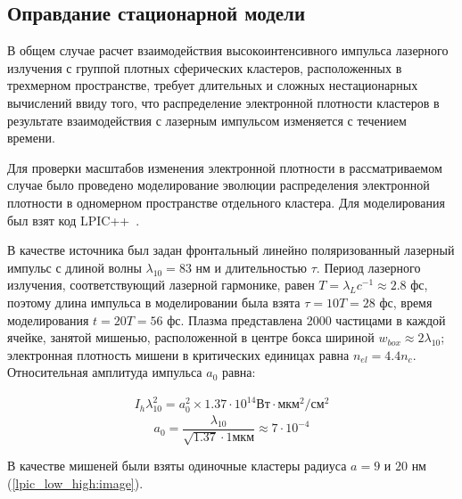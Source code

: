 \subsection{Оправдание стационарной модели}

В общем случае расчет взаимодействия высокоинтенсивного импульса лазерного излучения с группой плотных сферических кластеров, расположенных в трехмерном пространстве, требует длительных и сложных нестационарных вычислений ввиду того, что распределение электронной плотности кластеров в результате взаимодействия с лазерным импульсом изменяется с течением времени.

Для проверки масштабов изменения электронной плотности в рассматриваемом случае было проведено моделирование эволюции распределения электронной плотности в одномерном пространстве отдельного кластера. Для моделирования был взят код LPIC++~\cite{Pfund1998}.

В качестве источника был задан фронтальный линейно поляризованный лазерный импульс с длиной волны $\lambda_{10} = 83$ нм и длительностью $\tau$. Период лазерного излучения, соответствующий лазерной гармонике, равен $T = \lambda_{L} c^{-1} \approx 2.8$ фс, поэтому длина импульса в моделировании была взята $\tau = 10T = 28$ фс, время моделирования $t = 20T = 56$ фс. Плазма представлена 2000 частицами в каждой ячейке, занятой мишенью, расположенной в центре бокса шириной $w_{box} \approx 2\lambda_{10}$; электронная плотность мишени в критических единицах равна $n_{el} = 4.4 n_c$. Относительная амплитуда импульса $a_{0}$ равна:

    \begin{align}
        I_h \lambda_{10}^2 = a_0^2 \times 1.37 \cdot 10^{14} \textrm{Вт}\cdot\textrm{мкм}^2/\textrm{см}^2
    \end{align}
    \begin{equation*}
        a_0 = \frac{\lambda_{10}}{\sqrt{1.37} \cdot 1 \textrm{мкм}} \approx 7 \cdot 10^{-4}
    \end{equation*}




В качестве мишеней были взяты одиночные кластеры радиуса $a = 9 \textrm{ и }20$ нм (\autoref{lpic_low_high:image}).

